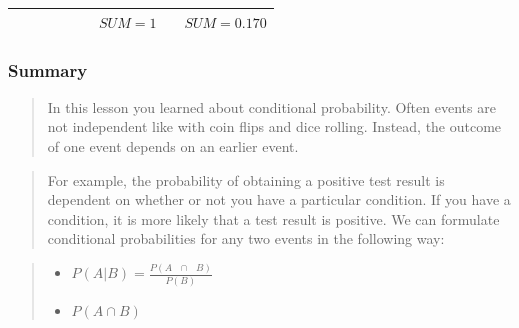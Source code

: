 \documentclass[]{book}
\providecommand{\tightlist}{%
  \setlength{\itemsep}{0pt}\setlength{\parskip}{0pt}}
\begin{document}
\begin{longtable}[]{@{}ccccccccc@{}}
\begin{minipage}[t]{0.04\columnwidth}\centering\strut
\strut
\end{minipage} & \begin{minipage}[t]{0.04\columnwidth}\centering\strut
\strut
\end{minipage} & \begin{minipage}[t]{0.04\columnwidth}\centering\strut
\strut
\end{minipage} & \begin{minipage}[t]{0.04\columnwidth}\centering\strut
\strut
\end{minipage} & \begin{minipage}[t]{0.04\columnwidth}\centering\strut
\strut
\end{minipage} & \begin{minipage}[t]{0.04\columnwidth}\centering\strut
\strut
\end{minipage} & \begin{minipage}[t]{0.04\columnwidth}\centering\strut
\(SUM = 1\)\strut
\end{minipage} & \begin{minipage}[t]{0.04\columnwidth}\centering\strut
\strut
\end{minipage} & \begin{minipage}[t]{0.04\columnwidth}\centering\strut
\(SUM = 0.170\)\strut
\end{minipage}\tabularnewline
\bottomrule
\end{longtable}

\subsubsection{Summary}\label{summary-1}

\begin{quote}
In this lesson you learned about conditional probability. Often events
are not independent like with coin flips and dice rolling. Instead, the
outcome of one event depends on an earlier event.
\end{quote}

\begin{quote}
For example, the probability of obtaining a positive test result is
dependent on whether or not you have a particular condition. If you have
a condition, it is more likely that a test result is positive. We can
formulate conditional probabilities for any two events in the following
way:
\end{quote}

\begin{quote}
\begin{itemize}
\tightlist
\item
  \(P(A|B) = \frac{P(A\text{ }\cap\text{ }B)}{P(B)}\)
\item
  \(P(A ∩ B)\)
\end{itemize}
\end{quote}
\end{document}
